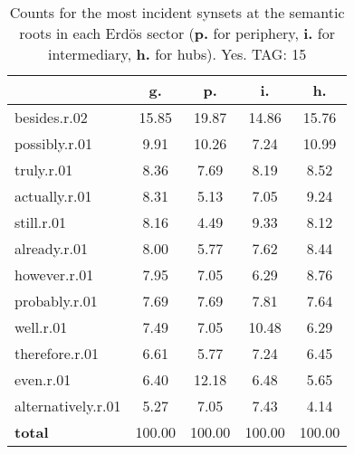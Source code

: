 \begin{table}[h!]
\begin{center}
\begin{tabular}{| l || c | c | c | c |}\hline
 & {\bf g.} & {\bf p.} & {\bf i.} & {\bf h.} \\\hline\hline
besides.r.02 & 15.85  & 19.87  & 14.86  & 15.76 \\\hline
possibly.r.01 & 9.91  & 10.26  & 7.24  & 10.99 \\\hline
truly.r.01 & 8.36  & 7.69  & 8.19  & 8.52 \\\hline
actually.r.01 & 8.31  & 5.13  & 7.05  & 9.24 \\\hline
still.r.01 & 8.16  & 4.49  & 9.33  & 8.12 \\\hline
already.r.01 & 8.00  & 5.77  & 7.62  & 8.44 \\\hline
however.r.01 & 7.95  & 7.05  & 6.29  & 8.76 \\\hline
probably.r.01 & 7.69  & 7.69  & 7.81  & 7.64 \\\hline
well.r.01 & 7.49  & 7.05  & 10.48  & 6.29 \\\hline
therefore.r.01 & 6.61  & 5.77  & 7.24  & 6.45 \\\hline
even.r.01 & 6.40  & 12.18  & 6.48  & 5.65 \\\hline
alternatively.r.01 & 5.27  & 7.05  & 7.43  & 4.14 \\\hline\hline
{{\bf total}} & 100.00  & 100.00  & 100.00  & 100.00 \\\hline
\end{tabular}
\caption{Counts for the most incident synsets at the semantic roots in each Erd\"os sector ({\bf p.} for periphery, {\bf i.} for intermediary, {\bf h.} for hubs). Yes. TAG: 15}
\end{center}
\end{table}